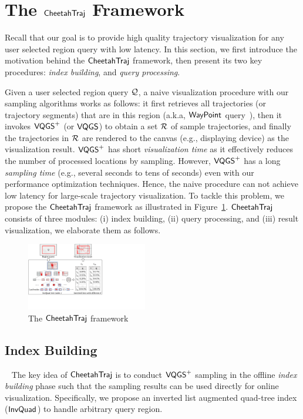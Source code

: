 \section{The $\mathsf{CheetahTraj}$ Framework}\label{sec:cheetahtraj}
Recall that our goal is to provide high quality trajectory visualization for any user selected region query with low latency.
In this section, we first introduce the motivation behind the $\mathsf{CheetahTraj}$ framework, then present its two key procedures: \textit{index building}, and \textit{query processing}.

Given a user selected region query $\mathcal{Q}$, a naive visualization procedure with our sampling algorithms works as follows:
it first retrieves all trajectories (or trajectory segments) that are in this region (a.k.a, $\mathsf{WayPoint}$ query~\cite{kruger2013trajectorylenses}),
then it invokes $\mathsf{VQGS}^+$ (or $\mathsf{VQGS}$) to obtain a set $\mathcal{R}$ of sample trajectories, and finally the trajectories in $\mathcal{R}$ are rendered to the canvas (e.g., displaying device) as the visualization result.
$\mathsf{VQGS}^+$ has short \textit{visualization time} as it effectively reduces the number of processed locations by sampling. However, $\mathsf{VQGS}^+$ has a long \textit{sampling time} (e.g., several seconds to tens of seconds) even with our performance optimization techniques.
Hence, the naive procedure can not achieve low latency for large-scale trajectory visualization. To tackle this problem, we propose the $\mathsf{CheetahTraj}$ framework as illustrated in Figure~\ref{fig:framework}.  $\mathsf{CheetahTraj}$ consists of three modules: (i) \textsf{index building}, (ii) \textsf{query processing}, and (iii) \textsf{result visualization}, we elaborate them as follows.


\begin{figure}
	\centering
	\includegraphics[width=0.47\textwidth]{pictures/cheetahtraj}
    \trim
    \caption{The $\mathsf{CheetahTraj}$ framework}
    \label{fig:framework}
    \trim
\end{figure}


\subsection{Index Building}~\label{sec:index}
The key idea of $\mathsf{CheetahTraj}$ is to conduct $\mathsf{VQGS}^+$ sampling in the offline \emph{index building} phase such that the sampling results can be used directly for online visualization.
Specifically, we propose an inverted list augmented quad-tree index ($\mathsf{InvQuad}$) to handle arbitrary query region.

